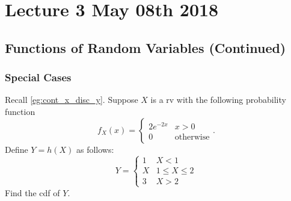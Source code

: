 \documentclass[notoc,notitlepage]{tufte-book}
\begin{document}
\chapter{Lecture 3 May 08th 2018}
\label{chp:lecture_3_may_08th_2018}

\section{Functions of Random Variables (Continued)}%
\label{sec:functions_of_random_variables_continued}

\subsection{Special Cases}%
\label{sub:special_cases}

\begin{eg}
  Recall \cref{eg:cont_x_disc_y}. Suppose $X$ is a rv with the following probability function
  \begin{equation*}
    f_X(x) = \begin{cases}
      2e^{-2x} & x > 0 \\
      0        & \text{otherwise}
    \end{cases}.
  \end{equation*}
  Define $Y = h(X)$ as follows:
  \begin{equation*}
    Y = \begin{cases}
      1 & X < 1 \\
      X & 1 \leq X \leq 2 \\
      3 & X > 2
    \end{cases}
  \end{equation*}
  Find the cdf of $Y$.
  
  \begin{solution}
  \end{solution}
\end{eg}


\end{document}
